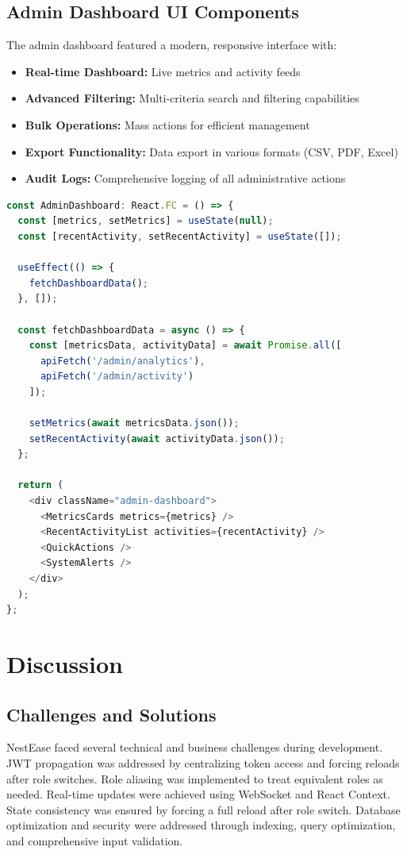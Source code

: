 \documentclass[conference]{IEEEtran}
\begin{document}
\subsection{Admin Dashboard UI Components}
The admin dashboard featured a modern, responsive interface with:

\begin{itemize}
    \item \textbf{Real-time Dashboard:} Live metrics and activity feeds
    \item \textbf{Advanced Filtering:} Multi-criteria search and filtering capabilities
    \item \textbf{Bulk Operations:} Mass actions for efficient management
    \item \textbf{Export Functionality:} Data export in various formats (CSV, PDF, Excel)
    \item \textbf{Audit Logs:} Comprehensive logging of all administrative actions
\end{itemize}

\begin{lstlisting}[language=TypeScript, caption=Admin Dashboard Component]
const AdminDashboard: React.FC = () => {
  const [metrics, setMetrics] = useState(null);
  const [recentActivity, setRecentActivity] = useState([]);
  
  useEffect(() => {
    fetchDashboardData();
  }, []);
  
  const fetchDashboardData = async () => {
    const [metricsData, activityData] = await Promise.all([
      apiFetch('/admin/analytics'),
      apiFetch('/admin/activity')
    ]);
    
    setMetrics(await metricsData.json());
    setRecentActivity(await activityData.json());
  };
  
  return (
    <div className="admin-dashboard">
      <MetricsCards metrics={metrics} />
      <RecentActivityList activities={recentActivity} />
      <QuickActions />
      <SystemAlerts />
    </div>
  );
};
\end{lstlisting}

\section{Discussion}
\subsection{Challenges and Solutions}
NestEase faced several technical and business challenges during development. JWT propagation was addressed by centralizing token access and forcing reloads after role switches. Role aliasing was implemented to treat equivalent roles as needed. Real-time updates were achieved using WebSocket and React Context. State consistency was ensured by forcing a full reload after role switch. Database optimization and security were addressed through indexing, query optimization, and comprehensive input validation.
\end{document}
